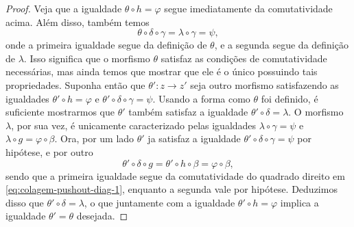 \begin{proof}
   Veja que a igualdade $\theta \circ h = \varphi$ segue imediatamente da comutatividade acima.
   Além disso, também temos
   \begin{displaymath}
     \theta \circ \delta \circ \gamma
     = \lambda \circ \gamma
     = \psi,
   \end{displaymath}
   onde a primeira igualdade segue da definição de $\theta$, e a segunda segue da definição de $\lambda$.
   Isso significa que o morfismo $\theta$ satisfaz as condições de comutatividade necessárias, mas ainda temos que mostrar que ele é o único possuindo tais propriedades.
   Suponha então que $\theta': z \to z'$ seja outro morfismo satisfazendo as igualdades $\theta' \circ h = \varphi$ e $\theta' \circ \delta \circ \gamma = \psi$.
   Usando a forma como $\theta$ foi definido, é suficiente mostrarmos que $\theta'$ também satisfaz a igualdade $\theta' \circ \delta = \lambda$.
   O morfismo $\lambda$, por sua vez, é unicamente caracterizado pelas igualdades $\lambda \circ \gamma = \psi$ e $\lambda \circ g = \varphi \circ \beta$.
   Ora, por um lado $\theta'$ ja satisfaz a igualdade $\theta' \circ \delta \circ \gamma = \psi$ por hipótese, e por outro
   \begin{displaymath}
     \theta' \circ \delta \circ g = \theta' \circ h \circ \beta = \varphi \circ \beta,
   \end{displaymath}
   sendo que a primeira igualdade segue da comutatividade do quadrado direito em \eqref{eq:colagem-pushout-diag-1}, enquanto a segunda vale por hipótese.
   Deduzimos disso que $\theta' \circ \delta = \lambda$, o que juntamente com a igualdade $\theta' \circ h = \varphi$ implica a igualdade $\theta' = \theta$ desejada.
 \end{proof}


